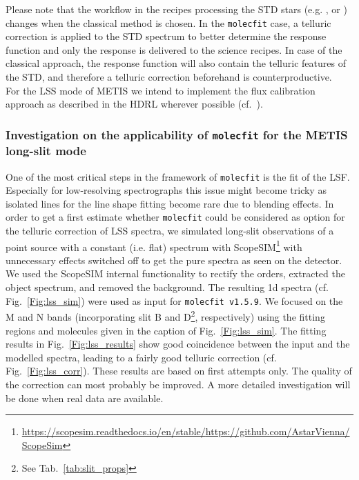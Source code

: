 Please note that the workflow in the recipes processing the \ac{STD} stars (e.g. ,  or ) changes when the classical method is chosen. In the \texttt{molecfit} case, a telluric correction is applied to the \ac{STD} spectrum to better determine the response function and only the response is delivered to the science recipes. In case of the classical approach, the response function will also contain the telluric features of the \ac{STD}, and therefore a telluric correction beforehand is counterproductive.\\
For the \ac{LSS} mode of \ac{METIS} we intend to implement the flux calibration approach as described in the \ac{HDRL} wherever possible (cf.~\cite{hdrl-manual}).\\ %
\subsubsection{Investigation on the applicability of \texttt{molecfit} for the METIS long-slit mode}\label{sec:mf_lss_applicability}
One of the most critical steps in the framework of \texttt{molecfit} is the fit of the \ac{LSF}. Especially for low-resolving spectrographs this issue might become tricky as isolated lines for the line shape fitting become rare due to blending effects. In order to get a first estimate whether \texttt{molecfit} could be considered as option for the telluric correction of \ac{LSS} spectra, we simulated long-slit observations of a point source with a constant (i.e. flat) spectrum with ScopeSIM\footnote{\url{https://scopesim.readthedocs.io/en/stable/}\newline\url{https://github.com/AstarVienna/ScopeSim}} with unnecessary effects switched off to get the pure spectra as seen on the detector. We used the ScopeSIM internal functionality to rectify the orders, extracted the object spectrum, and removed the background. The resulting 1d spectra (cf. Fig.~\ref{Fig:lss_sim}) were used as input for \texttt{molecfit v1.5.9}. We focused on the M and N bands (incorporating slit B and D\footnote{See Tab.~\ref{tab:slit_props}}, respectively) using the fitting regions and molecules given in the caption of Fig.~\ref{Fig:lss_sim}. The fitting results in Fig.~\ref{Fig:lss_results} show good coincidence between the input and the modelled spectra, leading to a fairly good telluric correction (cf. Fig.~\ref{Fig:lss_corr}). These results are based on first attempts only. The quality of the correction can most probably be improved. A more detailed investigation will be done when real data are available. \\

